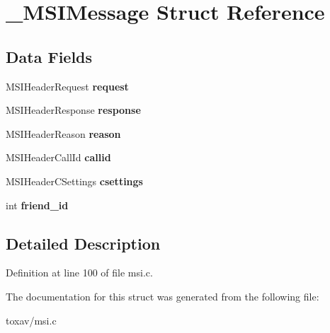 \hypertarget{struct___m_s_i_message}{\section{\+\_\+\+M\+S\+I\+Message Struct Reference}
\label{struct___m_s_i_message}
}
\subsection*{Data Fields}
\begin{DoxyCompactItemize}
\item 
\hypertarget{struct___m_s_i_message_a43928947ba3f33772bdeee09fd89557a}{M\+S\+I\+Header\+Request {\bfseries request}}\label{struct___m_s_i_message_a43928947ba3f33772bdeee09fd89557a}

\item 
\hypertarget{struct___m_s_i_message_a03f0f34008bf8be095af614ca99ea53f}{M\+S\+I\+Header\+Response {\bfseries response}}\label{struct___m_s_i_message_a03f0f34008bf8be095af614ca99ea53f}

\item 
\hypertarget{struct___m_s_i_message_aec4373dacf43cd56b5e67d2b04b63f5a}{M\+S\+I\+Header\+Reason {\bfseries reason}}\label{struct___m_s_i_message_aec4373dacf43cd56b5e67d2b04b63f5a}

\item 
\hypertarget{struct___m_s_i_message_a0cb3f797b633561175096933c2eb003e}{M\+S\+I\+Header\+Call\+Id {\bfseries callid}}\label{struct___m_s_i_message_a0cb3f797b633561175096933c2eb003e}

\item 
\hypertarget{struct___m_s_i_message_a4b09316f11dc8e9fe3b3357a6d48db56}{M\+S\+I\+Header\+C\+Settings {\bfseries csettings}}\label{struct___m_s_i_message_a4b09316f11dc8e9fe3b3357a6d48db56}

\item 
\hypertarget{struct___m_s_i_message_af43a034662e9bcac38e3bf4c9c150c19}{int {\bfseries friend\+\_\+id}}\label{struct___m_s_i_message_af43a034662e9bcac38e3bf4c9c150c19}

\end{DoxyCompactItemize}


\subsection{Detailed Description}


Definition at line 100 of file msi.\+c.



The documentation for this struct was generated from the following file\+:\begin{DoxyCompactItemize}
\item 
toxav/msi.\+c\end{DoxyCompactItemize}
